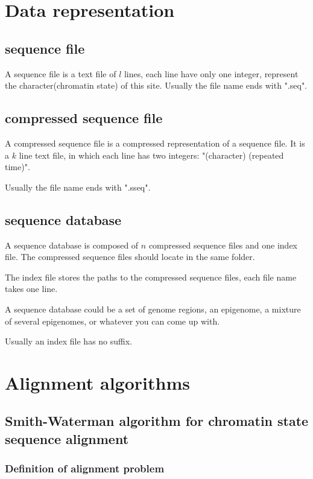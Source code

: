 \documentclass[a4paper]{article}
\begin{document}
\begin{CJK*}{UTF8}{kai}

\section{Data representation}
\subsection{sequence file}

A sequence file is a text file of $l$ lines, each line have only one integer, represent the character(chromatin state) of this site. Usually the file name ends with ".seq".

\subsection{compressed sequence file}

A compressed sequence file is a compressed representation of a sequence file. It is a $k$ line text file, in which each line has two integers: "(character) (repeated time)".

Usually the file name ends with ".sseq".

\subsection{sequence database}

A sequence database is composed of $n$ compressed sequence files and one index file. The compressed sequence files should locate in the same folder.

The index file stores the paths to the compressed sequence files, each file name takes one line.

A sequence database could be a set of genome regions, an epigenome, a mixture of several epigenomes, or whatever you can come up with.

Usually an index file has no suffix.

\section{Alignment algorithms}

\subsection{Smith-Waterman algorithm for chromatin state sequence alignment}

\subsubsection{Definition of alignment problem}


\end{CJK*}
\end{document}
